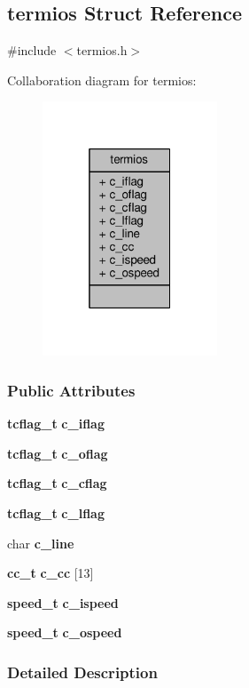 \subsection{termios Struct Reference}
\label{structtermios}


{\ttfamily \#include $<$termios.\+h$>$}



Collaboration diagram for termios\+:\nopagebreak
\begin{figure}[H]
\begin{center}
\leavevmode
\includegraphics[width=148pt]{d5/d1b/structtermios__coll__graph}
\end{center}
\end{figure}
\subsubsection*{Public Attributes}
\begin{DoxyCompactItemize}
\item 
{\bf tcflag\+\_\+t} {\bf c\+\_\+iflag}
\item 
{\bf tcflag\+\_\+t} {\bf c\+\_\+oflag}
\item 
{\bf tcflag\+\_\+t} {\bf c\+\_\+cflag}
\item 
{\bf tcflag\+\_\+t} {\bf c\+\_\+lflag}
\item 
char {\bf c\+\_\+line}
\item 
{\bf cc\+\_\+t} {\bf c\+\_\+cc} [13]
\item 
{\bf speed\+\_\+t} {\bf c\+\_\+ispeed}
\item 
{\bf speed\+\_\+t} {\bf c\+\_\+ospeed}
\end{DoxyCompactItemize}


\subsubsection{Detailed Description}


